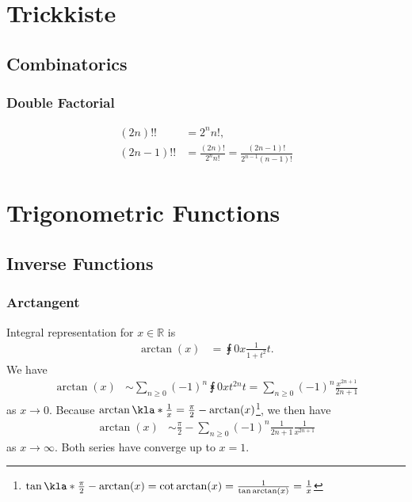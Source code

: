 \documentclass[english, parskip=full]{scrartcl}
\title{\Title}
\author{\Author}
\date{\today}
\begin{document}
\maketitle  %

\section{Trickkiste}
\subsection{Combinatorics}
\subsubsection{Double Factorial}
\begin{align}
(2n)!! &= 2^n n!,\\
(2n-1)!! &= \frac{(2n)!}{2^n n!} = \frac{(2n-1)!}{2^{n-1} (n-1)!}
\end{align} %
\section{Trigonometric Functions}
\subsection{Inverse Functions}
\subsubsection{Arctangent}
Integral representation for $x\in\mathbb{R}$ is
\begin{align}
\arctan(x) &= \intx{0}{x}{\frac{1}{1+t^2}}{t}.
\end{align}
We have 
\begin{align}
\arctan(x) &\sim \sum_{n\ge 0} (-1)^n \intx{0}{x}{t^{2n}}{t} = \sum_{n\ge 0} (-1)^n \frac{x^{2n+1}}{2n+1}
\end{align}
as $x\rightarrow 0$.
Because $\arctan\kla*{\frac{1}{x}} = \frac{\pi}{2} - \arctan(x)$\footnote{$\tan\kla*{\frac{\pi}{2} - \arctan(x)} = \cot\arctan(x) = \frac{1}{\tan\arctan(x)} = \frac{1}{x}$}, we then have
\begin{align}
\arctan(x) &\sim \frac{\pi}{2} - \sum_{n\ge 0} (-1)^n \frac{1}{2n+1} \frac{1}{x^{2n+1}}
\end{align}
as $x\rightarrow\infty$.
Both series have converge up to $x=1$.
\end{document}
